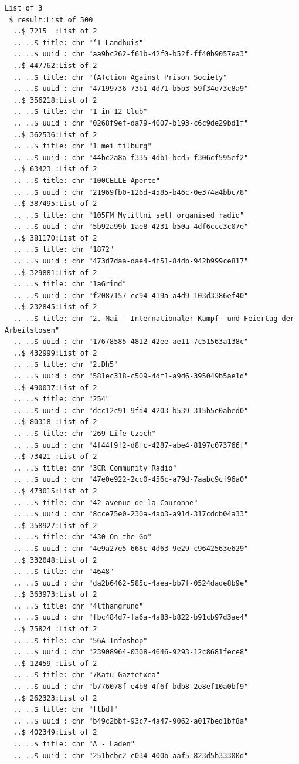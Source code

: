 \documentclass[
  letterpaper,
  DIV=11,
  numbers=noendperiod]{scrartcl}
\begin{document}
\begin{verbatim}
List of 3
 $ result:List of 500
  ..$ 7215  :List of 2
  .. ..$ title: chr "‘T Landhuis"
  .. ..$ uuid : chr "aa9bc262-f61b-42f0-b52f-ff40b9057ea3"
  ..$ 447762:List of 2
  .. ..$ title: chr "(A)ction Against Prison Society"
  .. ..$ uuid : chr "47199736-73b1-4d71-b5b3-59f34d73c8a9"
  ..$ 356218:List of 2
  .. ..$ title: chr "1 in 12 Club"
  .. ..$ uuid : chr "0268f9ef-da79-4007-b193-c6c9de29bd1f"
  ..$ 362536:List of 2
  .. ..$ title: chr "1 mei tilburg"
  .. ..$ uuid : chr "44bc2a8a-f335-4db1-bcd5-f306cf595ef2"
  ..$ 63423 :List of 2
  .. ..$ title: chr "100CELLE Aperte"
  .. ..$ uuid : chr "21969fb0-126d-4585-b46c-0e374a4bbc78"
  ..$ 387495:List of 2
  .. ..$ title: chr "105FM Mytillni self organised radio"
  .. ..$ uuid : chr "5b92a99b-1ae8-4231-b50a-4df6ccc3c07e"
  ..$ 381170:List of 2
  .. ..$ title: chr "1872"
  .. ..$ uuid : chr "473d7daa-dae4-4f51-84db-942b999ce817"
  ..$ 329881:List of 2
  .. ..$ title: chr "1aGrind"
  .. ..$ uuid : chr "f2087157-cc94-419a-a4d9-103d3386ef40"
  ..$ 232845:List of 2
  .. ..$ title: chr "2. Mai - Internationaler Kampf- und Feiertag der Arbeitslosen"
  .. ..$ uuid : chr "17678585-4812-42ee-ae11-7c51563a138c"
  ..$ 432999:List of 2
  .. ..$ title: chr "2.Dh5"
  .. ..$ uuid : chr "581ec318-c509-4df1-a9d6-395049b5ae1d"
  ..$ 490037:List of 2
  .. ..$ title: chr "254"
  .. ..$ uuid : chr "dcc12c91-9fd4-4203-b539-315b5e0abed0"
  ..$ 80318 :List of 2
  .. ..$ title: chr "269 Life Czech"
  .. ..$ uuid : chr "4f44f9f2-d8fc-4287-abe4-8197c073766f"
  ..$ 73421 :List of 2
  .. ..$ title: chr "3CR Community Radio"
  .. ..$ uuid : chr "47e0e922-2cc0-456c-a79d-7aabc9cf96a0"
  ..$ 473015:List of 2
  .. ..$ title: chr "42 avenue de la Couronne"
  .. ..$ uuid : chr "8cce75e0-230a-4ab3-a91d-317cddb04a33"
  ..$ 358927:List of 2
  .. ..$ title: chr "430 On the Go"
  .. ..$ uuid : chr "4e9a27e5-668c-4d63-9e29-c9642563e629"
  ..$ 332048:List of 2
  .. ..$ title: chr "4648"
  .. ..$ uuid : chr "da2b6462-585c-4aea-bb7f-0524dade8b9e"
  ..$ 363973:List of 2
  .. ..$ title: chr "4lthangrund"
  .. ..$ uuid : chr "fbc484d7-fa6a-4a83-b822-b91cb97d3ae4"
  ..$ 75824 :List of 2
  .. ..$ title: chr "56A Infoshop"
  .. ..$ uuid : chr "23908964-0308-4646-9293-12c8681fece8"
  ..$ 12459 :List of 2
  .. ..$ title: chr "7Katu Gaztetxea"
  .. ..$ uuid : chr "b776078f-e4b8-4f6f-bdb8-2e8ef10a0bf9"
  ..$ 262323:List of 2
  .. ..$ title: chr "[tbd]"
  .. ..$ uuid : chr "b49c2bbf-93c7-4a47-9062-a017bed1bf8a"
  ..$ 402349:List of 2
  .. ..$ title: chr "A - Laden"
  .. ..$ uuid : chr "251bcbc2-c034-400b-aaf5-823d5b33300d"

\end{verbatim}
\end{document}
